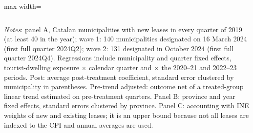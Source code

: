 \begin{table}[!htbp]
\begin{adjustbox}{max width=\linewidth}
\begin{tabular}{lcccccc}
\bottomrule\end{tabular}\end{adjustbox}
\begin{minipage}{0.97\linewidth}\footnotesize\vspace{4pt}
\textit{Notes}: panel A, Catalan municipalities with new leases in every quarter of 2019 (at least 40 in the year); wave 1: 140 municipalities designated on 16 March 2024 (first full quarter 2024Q2); wave 2: 131 designated in October 2024 (first full quarter 2024Q4). Regressions include municipality and quarter fixed effects, tourist-dwelling exposure $\times$ calendar quarter and $\times$ the 2020--21 and 2022--23 periods. Post: average post-treatment coefficient, standard error clustered by municipality in parentheses. Pre-trend adjusted: outcome net of a treated-group linear trend estimated on pre-treatment quarters. Panel B: province and year fixed effects, standard errors clustered by province. Panel C: accounting with INE weights of new and existing leases; it is an upper bound because not all leases are indexed to the CPI and annual averages are used.
\end{minipage}\end{table}